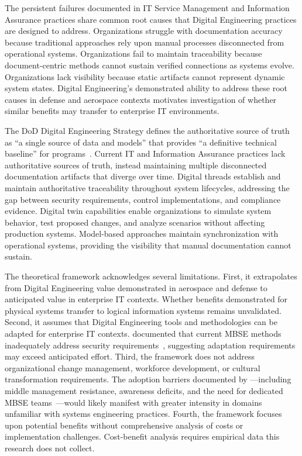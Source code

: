 The persistent failures documented in IT Service Management and Information Assurance practices share common root causes that Digital Engineering practices are designed to address. Organizations struggle with documentation accuracy because traditional approaches rely upon manual processes disconnected from operational systems. Organizations fail to maintain traceability because document-centric methods cannot sustain verified connections as systems evolve. Organizations lack visibility because static artifacts cannot represent dynamic system states. Digital Engineering's demonstrated ability to address these root causes in defense and aerospace contexts motivates investigation of whether similar benefits may transfer to enterprise IT environments.

The DoD Digital Engineering Strategy defines the authoritative source of truth as ``a single source of data and models'' that provides ``a definitive technical baseline'' for programs~\parencite{DoD_DE_Strategy_2018}. Current IT and Information Assurance practices lack authoritative sources of truth, instead maintaining multiple disconnected documentation artifacts that diverge over time. Digital threads establish and maintain authoritative traceability throughout system lifecycles, addressing the gap between security requirements, control implementations, and compliance evidence. Digital twin capabilities enable organizations to simulate system behavior, test proposed changes, and analyze scenarios without affecting production systems. Model-based approaches maintain synchronization with operational systems, providing the visibility that manual documentation cannot sustain.

The theoretical framework acknowledges several limitations. First, it extrapolates from Digital Engineering value demonstrated in aerospace and defense to anticipated value in enterprise IT contexts. Whether benefits demonstrated for physical systems transfer to logical information systems remains unvalidated. Second, it assumes that Digital Engineering tools and methodologies can be adapted for enterprise IT contexts. \citeauthor{Mazeika_Butleris_2020} documented that current MBSE methods inadequately address security requirements~\parencite{Mazeika_Butleris_2020}, suggesting adaptation requirements may exceed anticipated effort. Third, the framework does not address organizational change management, workforce development, or cultural transformation requirements. The adoption barriers documented by \citeauthor{Henderson_McDermott_Salado_2024}---including middle management resistance, awareness deficits, and the need for dedicated MBSE teams~\parencite{Henderson_McDermott_Salado_2024}---would likely manifest with greater intensity in domains unfamiliar with systems engineering practices. Fourth, the framework focuses upon potential benefits without comprehensive analysis of costs or implementation challenges. Cost-benefit analysis requires empirical data this research does not collect.

